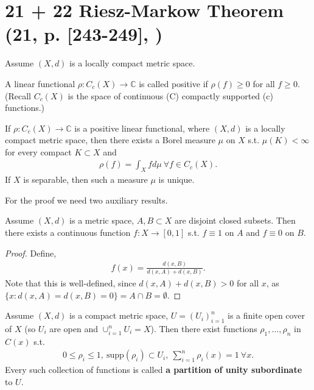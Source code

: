 \section*{21 + 22 Riesz-Markow Theorem \tiny(21, p. [243-249], \cite{schilling2017measures})}
Assume \((X,d)\) is a locally compact metric space. 
\begin{definition}
    A linear functional \(\rho:C_c(X)\rightarrow\mathbb{C}\) is called positive if \(\rho(f)\geq0\) for all \(f\geq0\). (Recall \(C_c(X)\) is the space of continuous (C) compactly supported (c) functions.)
\end{definition}
\begin{theorem}
    If \(\rho:C_c(X)\rightarrow \mathbb{C}\) is a positive linear functional, where \((X,d)\) is a locally compact metric space, then there exists a Borel measure \(\mu\) on \(X\) s.t. \(\mu(K)<\infty\) for every compact \(K\subset X\) and
    \begin{align*}
        \rho(f) = \int_X f d\mu \ \forall f\in C_c(X).
    \end{align*}
    If \(X\) is separable, then such a measure \(\mu\) is unique. 
\end{theorem}
For the proof we need two auxiliary results.
\begin{lemma}
    Assume \((X,d)\) is a metric space, \(A,B\subset X\) are disjoint closed subsets. Then there exists a continuous function \(f:X\rightarrow[0,1]\) s.t. \(f\equiv1\) on \(A\) and \(f\equiv0\) on \(B\).
\end{lemma}
\ifdetailed
\begin{proof}
    Define,
    \begin{align*}
        f(x) = \frac{d(x,B)}{d(x,A)+d(x,B)}.
    \end{align*}
    Note that this is well-defined, since
    \(d(x,A) + d(x,B)>0\) for all \(x\), as \(\{x:d(x,A)=d(x,B)=0\} = A\cap B = \emptyset\).
\end{proof}
\fi
\begin{lemma}
    Assume \((X,d)\) is a compact metric space, \(U=(U_i)_{i=1}^{n}\) is a finite open cover of \(X\) (so \(U_i\) are open and \(\cup_{i=1}^{n}U_i = X\)). Then there exist functions \(\rho_1, ..., \rho_n\) in \(C(x)\) s.t.
    \begin{align*}
        0\leq \rho_i\leq 1, \ \text{supp}(\rho_i)\subset U_i, \ \sum\limits_{i=1}^{n}\rho_i(x)=1 \ \forall x.
    \end{align*}
    Every such collection of functions is called \textbf{a partition of unity subordinate} to \(U\).
\end{lemma}
